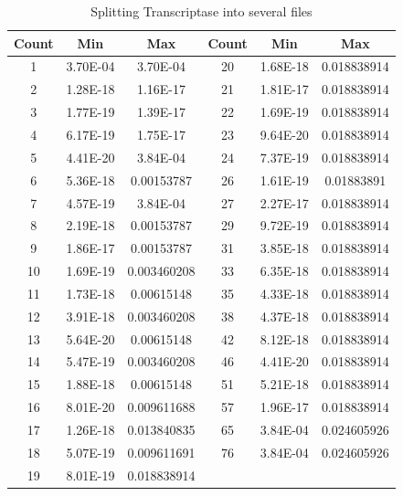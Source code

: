 \begin {table}[h]
\caption {Splitting Transcriptase into several files} \label{tab:splitvalues} 
  \begin{tabular}{|c|c|c|c|c|c|}  
  \midrule
 Count&Min&Max&Count&Min&Max\\
\midrule
1&3.70E-04&3.70E-04&20&1.68E-18&0.018838914\\
\midrule
2&1.28E-18&1.16E-17&21&1.81E-17&0.018838914\\
\midrule
3&1.77E-19&1.39E-17&22&1.69E-19&0.018838914\\
\midrule
4&6.17E-19&1.75E-17&23&9.64E-20&0.018838914\\
\midrule
5&4.41E-20&3.84E-04&24&7.37E-19&0.018838914\\
\midrule
6&5.36E-18&0.00153787&26&1.61E-19&0.01883891\\
\midrule
7&4.57E-19&3.84E-04&27&2.27E-17&0.018838914\\
\midrule
8&2.19E-18&0.00153787&29&9.72E-19&0.018838914\\
\midrule
9&1.86E-17&0.00153787&31&3.85E-18&0.018838914\\
\midrule
10&1.69E-19&0.003460208&33&6.35E-18&0.018838914\\
\midrule
11&1.73E-18&0.00615148&35&4.33E-18&0.018838914\\
\midrule
12&3.91E-18&0.003460208&38&4.37E-18&0.018838914\\
\midrule
13&5.64E-20&0.00615148&42&8.12E-18&0.018838914\\
\midrule
14&5.47E-19&0.003460208&46&4.41E-20&0.018838914\\
\midrule
15&1.88E-18&0.00615148&51&5.21E-18&0.018838914\\
\midrule
16&8.01E-20&0.009611688&57&1.96E-17&0.018838914\\
\midrule
17&1.26E-18&0.013840835&65&3.84E-04&0.024605926\\
\midrule
18&5.07E-19&0.009611691&76&3.84E-04&0.024605926\\
\midrule
19&8.01E-19&0.018838914\\
\cmidrule{1-3}
\end{tabular}
 \end {table}

